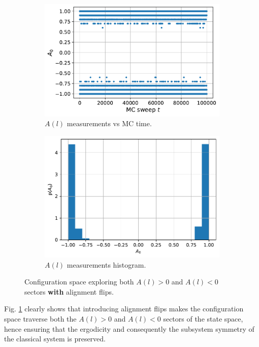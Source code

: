 \documentclass[../thesis_main.tex]{subfiles}
\begin{document}
\begin{figure}[!htb]
    \centering
    \begin{subfigure}[b]{0.47\textwidth}
        \centering
        \includegraphics[width=\textwidth]{images/fix_subsystem_symmetry/measurement A(l) vs MC time (l=0).pdf}
        \caption{ $A(l)$ measurements vs MC time.}
    \end{subfigure}
    \hspace{1em}  %
    \begin{subfigure}[b]{0.45\textwidth}
        \centering
        \includegraphics[width=\textwidth]{images/fix_subsystem_symmetry/measurement A(l) histogram (l=0).pdf}
        \caption{ $A(l)$ measurements histogram.}
    \end{subfigure}
    \caption{Configuration space exploring both $A(l)>0$ and $A(l)<0$ sectors \textbf{with} alignment flips.}
    \label{alignflipmeasurements}
\end{figure}
Fig. \ref{alignflipmeasurements} clearly shows that introducing alignment flips makes the configuration space traverse both the $A(l)>0$ and $A(l)<0$ sectors of the state space, hence ensuring that the ergodicity and consequently the subsystem symmetry of the classical system is preserved.   
\end{document}
